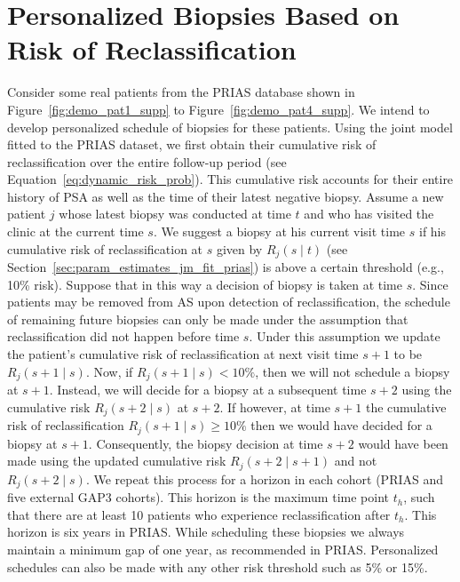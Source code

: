\section{Personalized Biopsies Based on Risk of Reclassification}
Consider some real patients from the PRIAS database shown in Figure~\ref{fig:demo_pat1_supp} to Figure~\ref{fig:demo_pat4_supp}. We intend to develop personalized schedule of biopsies for these patients. Using the joint model fitted to the PRIAS dataset, we first obtain their cumulative risk of reclassification over the entire follow-up period (see Equation~\ref{eq:dynamic_risk_prob}). This cumulative risk accounts for their entire history of PSA as well as the time of their latest negative biopsy. Assume a new patient $j$ whose latest biopsy was conducted at time $t$ and who has visited the clinic at the current time $s$. We suggest a biopsy at his current visit time $s$ if his cumulative risk of reclassification at $s$ given by $R_j(s \mid t)$ (see Section~\ref{sec:param_estimates_jm_fit_prias}) is above a certain threshold (e.g., 10\% risk). Suppose that in this way a decision of biopsy is taken at time $s$. Since patients may be removed from AS upon detection of reclassification, the schedule of remaining future biopsies can only be made under the assumption that reclassification did not happen before time $s$. Under this assumption we update the patient's cumulative risk of reclassification at next visit time $s+1$ to be $R_j(s + 1 \mid s)$. Now, if $R_j(s + 1 \mid s) < 10\%$, then we will not schedule a biopsy at $s+1$. Instead, we will decide for a biopsy at a subsequent time $s + 2$ using the cumulative risk $R_j(s + 2 \mid s)$ at $s+2$. If however, at time $s+1$ the cumulative risk of reclassification $R_j(s + 1 \mid s) \geq 10\%$ then we would have decided for a biopsy at $s+1$. Consequently, the biopsy decision at time $s + 2$ would have been made using the updated cumulative risk $R_j(s + 2 \mid s + 1)$ and not $R_j(s + 2 \mid s)$. We repeat this process for a horizon in each cohort (PRIAS and five external GAP3 cohorts). This horizon is the maximum time point $t_h$, such that there are at least 10 patients who experience reclassification after $t_h$. This horizon is six years in PRIAS. While scheduling these biopsies we always maintain a minimum gap of one year, as recommended in PRIAS. Personalized schedules can also be made with any other risk threshold such as 5\% or 15\%.


